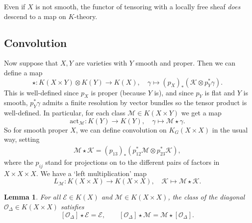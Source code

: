 \documentclass[11pt]{amsart}
\newtheorem{lemma}[dummy]{Lemma}
\theoremstyle{definition}
\newcommand{\Kc}{\mathcal{K}}
\newcommand{\Mca}{\mathcal{M}}
\newcommand{\act}{\mathrm{act}}
\newcommand{\Ec}{\mathcal{E}}
\newcommand{\Oc}{\mathcal{O}}
\numberwithin{equation}{subsection}
\numberwithin{figure}{subsection}
\begin{document}
Even if $X$ is not smooth, the functor of tensoring with a locally free sheaf \emph{does} descend to a map on $K$-theory. 


\subsection{Convolution}
Now suppose that $X,Y$ are varieties with $Y$ smooth and proper. Then we can define a map
$$
\star\colon K(X\times Y)\otimes K(Y)\rightarrow  K(X), \quad \gamma\mapsto (p_X)_*\left(\mathcal{K}\otimes p_Y^*\gamma\right).
$$
This is well-defined since $p_X$ is proper (because $Y$ is), and since $p_Y$ is flat and $Y$ is smooth, $p_Y^*\gamma$ admits a finite resolution by vector bundles so the tensor product is well-defined. In particular, for each class $\Mca\in K(X\times Y)$ we get a map
$$
\act_\Mca \colon K(Y)\rightarrow K(Y), \quad \gamma\mapsto \Mca\star \gamma.
$$
So for smooth proper $X$, we can define convolution on $K_G(X\times X)$ in the usual way, setting
\begin{align}
\label{eq:convolution-mm}
\Mca\star\Kc = (p_{13})_*\left(p_{12}^*\Mca\otimes p_{23}^*\Kc\right),
\end{align}
where the $p_{ij}$ stand for projections on to the different pairs of factors in $X\times X\times X$. We have a `left multiplication' map
$$
L_\Mca \colon  K(X\times X)\rightarrow K(X\times X), \quad \Kc\mapsto \Mca\star\Kc.
$$

\begin{lemma}
For all $\Ec\in K(X)$ and $\Mca\in K(X\times X)$, the class of the diagonal $\Oc_\Delta\in K(X\times X)$ satisfies 
$$
[\Oc_\Delta]\star \Ec =\Ec,\qquad [\Oc_\Delta]\star \Mca = \Mca\star [\Oc_\Delta] .
$$
\end{lemma}
\end{document}
